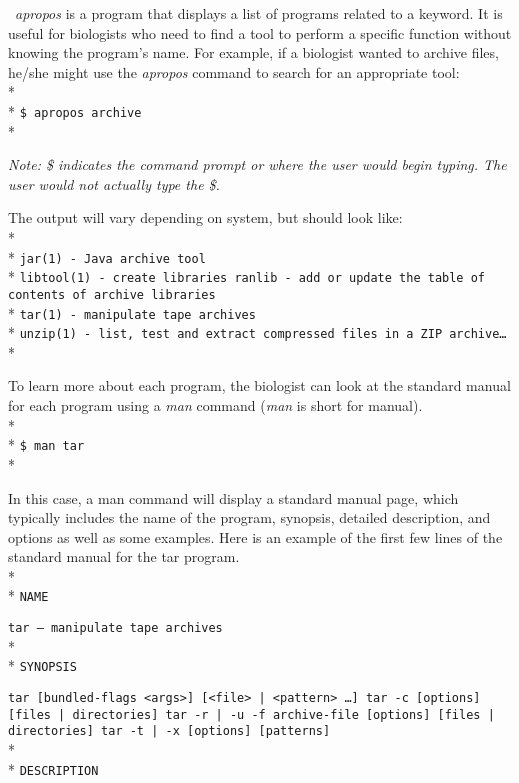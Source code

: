 \documentclass[ChapterTOCs,krantz2]{krantz} %
\begin{document}
\ \emph{apropos}
is a program that
displays a list of programs related to a keyword. It is
useful for biologists who need to find a tool to perform a specific function without 
knowing the program's name. For example, if a biologist wanted to archive files,
he/she might use the \emph{apropos} command to search for an appropriate tool:\\* \\*
\texttt{\$ apropos archive}\\*

\noindent
\textsl{Note: \$ indicates the command prompt or where the user would begin typing.
The user would not actually type the \$.}

The output will vary depending on system, but should look like:\\* \\*
\texttt{jar(1)    - Java archive tool}\\*
\texttt{libtool(1)    - create libraries ranlib - add or update the table of
contents of archive libraries}\\*
\texttt{tar(1)    - manipulate tape archives}\\*
\texttt{unzip(1)    - list, test and extract compressed files in a
ZIP archive\ldots}\\*

\noindent
To learn more about each program, 
the biologist can look at the standard manual for each program using a
\emph{man} command (\emph{man} is short for manual).\\* \\*
\texttt{\$ man tar}\\*

\noindent
In this case, a man command will display a standard manual page, which
typically includes the name of the program, synopsis, detailed description, and
options as well as some examples. Here is an example of the first few lines of
the standard manual for the tar program.\\* \\*
\texttt{NAME}

\texttt{tar -- manipulate tape archives}\\* \\*
\texttt{SYNOPSIS}

\texttt{tar [bundled-flags <args>] [<file> | <pattern> \ldots] tar {-c}
[options] [files | directories] tar {-r | -u} -f archive-file [options] [files
| directories] tar {-t | -x} [options] [patterns]}\\* \\*
\texttt{DESCRIPTION}
\end{document}
